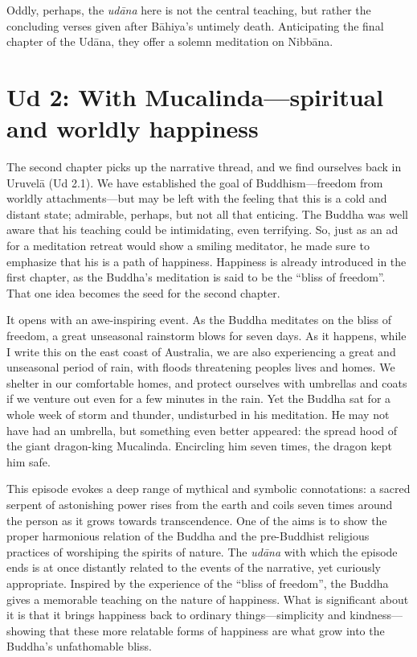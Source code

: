 \documentclass[12pt,openany]{book}%
\begin{document}
Oddly, perhaps, the \textit{\textsanskrit{udāna}} here is not the central teaching, but rather the concluding verses given after \textsanskrit{Bāhiya}’s untimely death. Anticipating the final chapter of the \textsanskrit{Udāna}, they offer a solemn meditation on \textsanskrit{Nibbāna}.

\section*{Ud 2: With Mucalinda—spiritual and worldly happiness}

The second chapter picks up the narrative thread, and we find ourselves back in \textsanskrit{Uruvelā} (Ud 2.1). We have established the goal of Buddhism—freedom from worldly attachments—but may be left with the feeling that this is a cold and distant state; admirable, perhaps, but not all that enticing. The Buddha was well aware that his teaching could be intimidating, even terrifying. So, just as an ad for a meditation retreat would show a smiling meditator, he made sure to emphasize that his is a path of happiness. Happiness is already introduced in the first chapter, as the Buddha’s meditation is said to be the “bliss of freedom”.  That one idea becomes the seed for the second chapter.

It opens with an awe-inspiring event. As the Buddha meditates on the bliss of freedom, a great unseasonal rainstorm blows for seven days. As it happens, while I write this on the east coast of Australia, we are also experiencing a great and unseasonal period of rain, with floods threatening peoples lives and homes. We shelter in our comfortable homes, and protect ourselves with umbrellas and coats if we venture out even for a few minutes in the rain. Yet the Buddha sat for a whole week of storm and thunder, undisturbed in his meditation. He may not have had an umbrella, but something even better appeared: the spread hood of the giant dragon-king Mucalinda. Encircling him seven times, the dragon kept him safe.

This episode evokes a deep range of mythical and symbolic connotations: a sacred serpent of astonishing power rises from the earth and coils seven times around the person as it grows towards transcendence. One of the aims is to show the proper harmonious relation of the Buddha and the pre-Buddhist religious practices of worshiping the spirits of nature. The \textit{\textsanskrit{udāna}} with which the episode ends is at once distantly related to the events of the narrative, yet curiously appropriate. Inspired by the experience of the “bliss of freedom”, the Buddha gives a memorable teaching on the nature of happiness. What is significant about it is that it brings happiness back to ordinary things—simplicity and kindness—showing that these more relatable forms of happiness are what grow into the Buddha’s unfathomable bliss.
\end{document}
